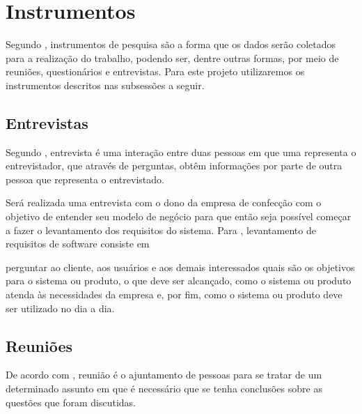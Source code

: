 \section{Instrumentos}

\par Segundo , instrumentos de pesquisa são a
forma que os dados serão coletados para a realização do trabalho, podendo ser,
dentre outras formas, por meio de reuniões, questionários e entrevistas. Para
este projeto utilizaremos os instrumentos descritos nas subsessões a seguir.

\subsection{Entrevistas}
\par Segundo , entrevista é
uma interação entre duas pessoas em que uma representa o entrevistador, 
que através de perguntas, obtêm informações por parte de outra pessoa que
representa o entrevistado.





\par Será realizada uma entrevista com o dono da empresa de confecção com o
objetivo de entender seu modelo de negócio para que então seja possível começar
a fazer o levantamento dos requisitos do sistema. Para
, levantamento de requisitos de
software consiste em

\begin{citacao}
perguntar ao cliente, aos usuários e aos demais interessados quais são os
objetivos para o sistema ou produto, o que deve ser alcançado, como o sistema ou
produto atenda às necessidades da empresa e, por fim, como o sistema ou produto
deve ser utilizado no dia a dia.
\end{citacao} 


\subsection{Reuniões}
\par De acordo com , reunião é o ajuntamento de
pessoas para se tratar de um determinado assunto em que é necessário que se
tenha conclusões sobre as questões que foram discutidas.

